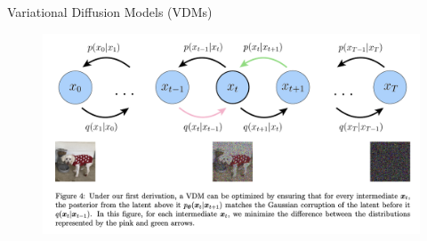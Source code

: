 \begin{frame}{Variational Diffusion Models (VDMs)}
    \begin{figure}
        \centering
        \includegraphics[width=0.9\linewidth]{images/vdm_fig4.png}
    \end{figure}
\end{frame}